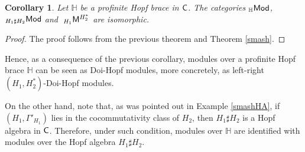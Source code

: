 \documentclass[11pt,reqno]{amsart}
\theoremstyle{plain}%
\newtheorem{corollary}[theorem]{Corollary}%
\theoremstyle{definition}
\theoremstyle{remark}
\begin{document}
\begin{corollary}\label{mainthcor}
	Let $\mathbb{H}$ be a profinite Hopf brace in ${\sf C}$. The categories ${}_{\mathbb{H}}{\sf Mod}$, ${}_{H_{1}\sharp H_{2}}{\sf Mod}$ and $\;_{H_1}{\sf M}^{H_{2}^{\ast}}$  are isomorphic.
\end{corollary}
\begin{proof}
The proof follows from the previous theorem and Theorem \ref{smash}.
\end{proof}
	
	
 Hence, as a consequence of the previous corollary, modules over a profinite Hopf brace $\mathbb{H}$ can be seen as Doi-Hopf modules, more concretely,  as left-right $(H_{1}, H_{2}^{\ast})$-Doi-Hopf modules.  

On the other hand, note that, as was pointed out in Example \ref{smashHA}, if $(H_{1},\Gamma'_{H_{1}})$ lies in the cocommutativity class of $H_{2}$, then $H_{1}\sharp H_{2}$ is a Hopf algebra in ${\sf C}$. Therefore, under such condition, modules over $\mathbb{H}$ are identified with modules over the Hopf algebra $H_{1}\sharp H_{2}$. 
\end{document}
